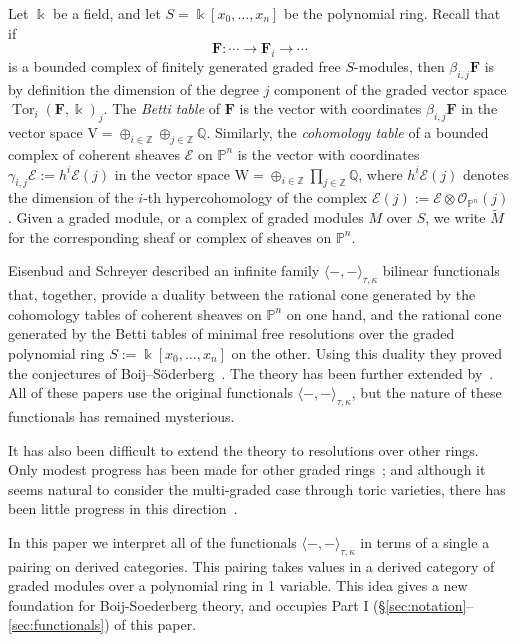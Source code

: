 \documentclass[12pt]{amsart}
\theoremstyle{definition}
\theoremstyle{remark}
\newcommand{\Tor}{\operatorname{Tor}}
\newcommand{\kk}{\Bbbk}
\newcommand{\PP}{\mathbb{P}}
\newcommand{\ZZ}{\mathbb{Z}}
\newcommand{\QQ}{\mathbb{Q}}
\newcommand{\VV}{\mathrm{V}}
\newcommand{\WW}{\mathrm{W}}
\newcommand{\cO}{\mathcal{O}}
\newcommand{\cE}{\mathcal{E}}
\newcommand{\FF}{\mathbf{F}}
\begin{document}
Let $\kk$ be a field, and let $S=\kk[x_0, \dots, x_n]$ be the polynomial ring. Recall that if 
$$
\FF: \cdots \to \FF_{i}\to \cdots
$$
is a bounded complex of finitely generated graded free $S$-modules, then $\beta_{i,j}\FF$ is by definition the dimension of the degree $j$ component of the graded vector space $\Tor_i(\FF,\kk)_j$.  The \emph{Betti table} of $\FF$ is the vector with coordinates $\beta_{i,j}\FF$ in the vector space $\VV = \oplus_{i\in \ZZ} \oplus_{j\in \ZZ}\QQ$. Similarly, the \emph{cohomology table} of a bounded complex of coherent sheaves $\cE$ on $\PP^{n}$ is the vector with coordinates $\gamma_{i,j}\cE := h^{i}\cE(j)$ in the vector space $\WW = \oplus_{i\in \ZZ}\prod_{j\in \ZZ}\QQ$, where $h^{i}\cE(j)$ denotes the dimension of the $i$-th hypercohomology of the complex $\cE(j) := \cE \otimes \cO_{\PP^{n}}(j)$. 
Given a graded module, or a complex of graded modules $M$ over $S$, we write $\widetilde M$ for the corresponding sheaf or complex of sheaves on $\PP^{n}$. 


Eisenbud and Schreyer \cite{eis-schrey1} described an infinite family $\langle -,-\rangle_{\tau,\kappa}$ bilinear functionals that, together, provide a duality between the rational cone generated by the cohomology tables of coherent sheaves on $\PP^n$ on one hand,  and the rational cone generated by the Betti tables of minimal free resolutions over the graded polynomial ring $S:=\kk[x_0, \dots, x_n]$ on the other. 
Using this duality they proved the conjectures of Boij--S\"oderberg~\cite{boij-sod1}. The theory has been further extended by~\cites{boij-sod2,eis-schrey2}. All of these papers use the original functionals $\langle -,-\rangle_{\tau,\kappa}$, but the nature of these functionals has remained mysterious. 

It has also been difficult to extend the theory to resolutions over other rings.  Only modest progress has been made for other graded rings~\cite{beks-local}; and although it seems natural to consider the multi-graded case through toric varieties, there has been little progress in this direction~\cites{boij-floystad,floystad-multigraded}.

In this paper we interpret all of the functionals $\langle-,-\rangle_{\tau,\kappa}$ in terms of a single a pairing on derived categories. This pairing takes values in a derived category of graded modules over a polynomial ring in 1 variable.  This idea gives a new foundation for Boij-Soederberg theory, and occupies Part I (\S\ref{sec:notation}--\ref{sec:functionals}) of this paper. 
\end{document}

